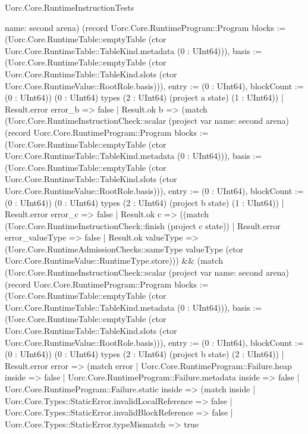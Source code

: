 \begin{lexlean}{Uorc.Core.RuntimeInstructionTests}
\begin{semanticmodule}
{{{{{{                        name: second
                      } arena) (record Uorc.Core.RuntimeProgram::Program {blocks := (Uorc.Core.RuntimeTable::emptyTable (ctor Uorc.Core.RuntimeTable::TableKind.metadata (0 : UInt64))), basis := (Uorc.Core.RuntimeTable::emptyTable (ctor Uorc.Core.RuntimeTable::TableKind.slots (ctor Uorc.Core.RuntimeValue::RootRole.basis))), entry := (0 : UInt64), blockCount := (0 : UInt64)}) (0 : UInt64) types (2 : UInt64) (project a state) (1 : UInt64))
                      | Result.error error_b => false
                      | Result.ok b => (match (Uorc.Core.RuntimeInstructionCheck::scalar (project var{
                          name: second
                        } arena) (record Uorc.Core.RuntimeProgram::Program {blocks := (Uorc.Core.RuntimeTable::emptyTable (ctor Uorc.Core.RuntimeTable::TableKind.metadata (0 : UInt64))), basis := (Uorc.Core.RuntimeTable::emptyTable (ctor Uorc.Core.RuntimeTable::TableKind.slots (ctor Uorc.Core.RuntimeValue::RootRole.basis))), entry := (0 : UInt64), blockCount := (0 : UInt64)}) (0 : UInt64) types (2 : UInt64) (project b state) (1 : UInt64))
                        | Result.error error_c => false
                        | Result.ok c => ((match (Uorc.Core.RuntimeInstructionCheck::finish (project c state))
                          | Result.error error_valueType => false
                          | Result.ok valueType => (Uorc.Core.RuntimeAdmissionChecks::sameType valueType (ctor Uorc.Core.RuntimeValue::RuntimeType.store))) && (match (Uorc.Core.RuntimeInstructionCheck::scalar (project var{
                            name: second
                          } arena) (record Uorc.Core.RuntimeProgram::Program {blocks := (Uorc.Core.RuntimeTable::emptyTable (ctor Uorc.Core.RuntimeTable::TableKind.metadata (0 : UInt64))), basis := (Uorc.Core.RuntimeTable::emptyTable (ctor Uorc.Core.RuntimeTable::TableKind.slots (ctor Uorc.Core.RuntimeValue::RootRole.basis))), entry := (0 : UInt64), blockCount := (0 : UInt64)}) (0 : UInt64) types (2 : UInt64) (project b state) (2 : UInt64))
                          | Result.error error => (match error
                            | Uorc.Core.RuntimeProgram::Failure.heap inside => false
                            | Uorc.Core.RuntimeProgram::Failure.metadata inside => false
                            | Uorc.Core.RuntimeProgram::Failure.static inside => (match inside
                              | Uorc.Core.Types::StaticError.invalidLocalReference => false
                              | Uorc.Core.Types::StaticError.invalidBlockReference => false
                              | Uorc.Core.Types::StaticError.typeMismatch => true
}}}}}
\end{semanticmodule}
\end{lexlean}
